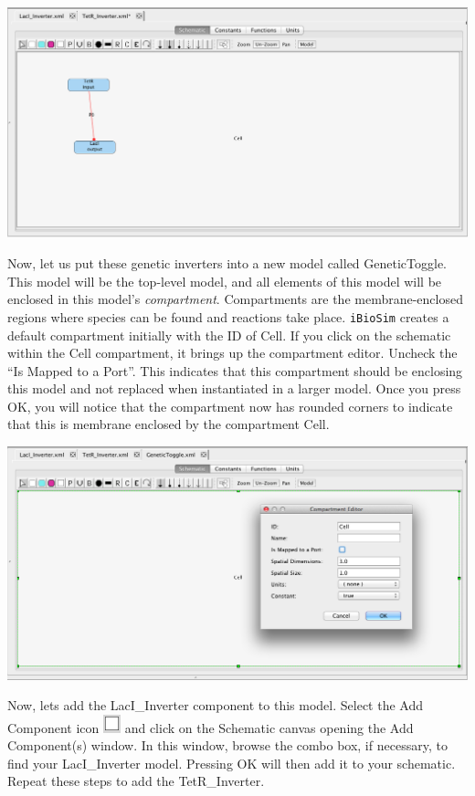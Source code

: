 \documentclass[titlepage,11pt]{article}
\begin{document}
\begin{center}
\includegraphics[width=160mm]{screenshots/implicitPromoterGT}
\end{center}

Now, let us put these genetic inverters into a new model called GeneticToggle.
This model will be the top-level model, and all elements of this model will be enclosed in this model's \emph{compartment}.  Compartments are the membrane-enclosed regions where species can be found and reactions take place.  {\tt iBioSim} creates a default compartment initially with the ID of Cell.  If you click on the schematic within the Cell compartment, it brings up the compartment editor.  Uncheck the ``Is Mapped to a Port''.  This indicates that this compartment should be enclosing this model and not replaced when instantiated in a larger model.  Once you press OK, you will notice that the compartment now has rounded corners to indicate that this is membrane enclosed by the compartment Cell.

\begin{center}
\includegraphics[width=160mm]{screenshots/compartmentGT}
\end{center}

Now, lets add the LacI\_Inverter component to this model.  Select the Add Component icon \includegraphics{../gui/icons/modelview/add_component_selected} and click on the Schematic canvas opening the Add Component(s) window.  In this window, browse the combo box, if necessary, to find your LacI\_Inverter model.  Pressing OK will then add it to your schematic.  Repeat these steps to add the TetR\_Inverter.
\end{document}
